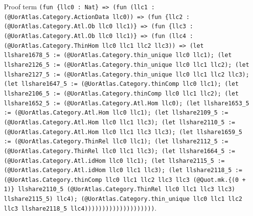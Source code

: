 \documentclass[11pt]{article}
\begin{document}
\noindent Proof term \texttt{(fun \{llc0 : Nat\} => (fun (llc1 : (@UorAtlas.Category.ActionData llc0)) => (fun \{llc2 : (@UorAtlas.Category.Atl.Ob llc0 llc1)\} => (fun \{llc3 : (@UorAtlas.Category.Atl.Ob llc0 llc1)\} => (fun (llc4 : (@UorAtlas.Category.ThinHom llc0 llc1 llc2 llc3)) => (let llshare1678\_5 := (@UorAtlas.Category.thin\_unique llc0 llc1); (let llshare2126\_5 := (@UorAtlas.Category.thin\_unique llc0 llc1 llc2); (let llshare2127\_5 := (@UorAtlas.Category.thin\_unique llc0 llc1 llc2 llc3); (let llshare1647\_5 := (@UorAtlas.Category.thinComp llc0 llc1); (let llshare2106\_5 := (@UorAtlas.Category.thinComp llc0 llc1 llc2); (let llshare1652\_5 := (@UorAtlas.Category.Atl.Hom llc0); (let llshare1653\_5 := (@UorAtlas.Category.Atl.Hom llc0 llc1); (let llshare2109\_5 := (@UorAtlas.Category.Atl.Hom llc0 llc1 llc3); (let llshare2110\_5 := (@UorAtlas.Category.Atl.Hom llc0 llc1 llc3 llc3); (let llshare1659\_5 := (@UorAtlas.Category.ThinRel llc0 llc1); (let llshare2112\_5 := (@UorAtlas.Category.ThinRel llc0 llc1 llc3); (let llshare1664\_5 := (@UorAtlas.Category.Atl.idHom llc0 llc1); (let llshare2115\_5 := (@UorAtlas.Category.Atl.idHom llc0 llc1 llc3); (let llshare2118\_5 := (@UorAtlas.Category.thinComp llc0 llc1 llc2 llc3 llc3 (@Quot.mk.\{(0 + 1)\} llshare2110\_5 (@UorAtlas.Category.ThinRel llc0 llc1 llc3 llc3) llshare2115\_5) llc4); (@UorAtlas.Category.thin\_unique llc0 llc1 llc2 llc3 llshare2118\_5 llc4))))))))))))))))))))}.\par
\end{document}
